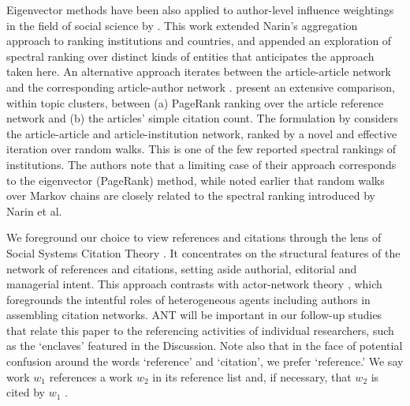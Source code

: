 Eigenvector methods have been also applied to author-level influence weightings in the field of social science by \textcite{westAuthorlevelEigenfactorMetrics2013}. This work extended Narin's aggregation approach to ranking institutions and countries, and appended an exploration of spectral ranking over distinct kinds of entities that anticipates the approach taken here. An alternative approach iterates between the article-article network and the corresponding article-author network \citep{ujumBestBothWorlds2015, palCITEXNewCitation2015}. \textcite{chenArticlesScientificPrestige2023} present an extensive comparison, within topic clusters, between (a) PageRank ranking over the article reference network and (b) the articles' simple citation count. The formulation by \textcite{caoRankingAcademicInstitutions2023} considers the article-article and article-institution network, ranked by a novel and effective iteration over random walks. This is one of the few reported spectral rankings of institutions. The authors note that a limiting case of their approach corresponds to the eigenvector (PageRank) method, while \textcite{gellerCitationInfluenceMethodology1978} noted earlier that random walks over Markov chains are closely related to the spectral ranking introduced by Narin et al. 

We foreground our choice to view references and citations through the lens of Social Systems Citation Theory \citep[][SSCT]{tahamtanSocialSystemsCitation2022}. It concentrates on the structural features of the network of references and citations, setting aside authorial, editorial and managerial intent. This approach contrasts with actor-network theory \citep[][ANT]{latourReassemblingSocialIntroduction2007}, which foregrounds the intentful roles of heterogeneous agents including authors
in assembling citation networks. ANT will be important in our follow-up studies that relate this paper to the referencing activities of individual researchers, such as the `enclaves' featured in the Discussion. Note also that in the face of potential confusion around the words `reference' and `citation', we prefer `reference.' We say work $w_1$ references a work $w_2$ in its reference list and, if necessary, that $w_2$ is cited by $w_1$ \citep{woutersCitationCulture1999}.

